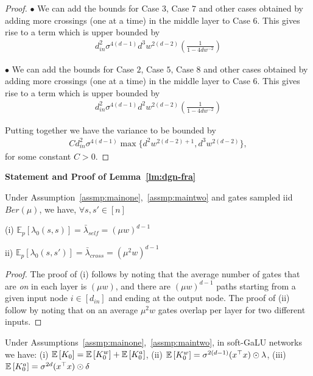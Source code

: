 \begin{proof}
$\bullet$ We can add the bounds for Case $3$, Case $7$ and other cases obtained by adding more crossings (one at a time) in the middle layer to Case $6$. This gives rise to a term which is upper bounded by 
\begin{align*}
d^2_{in}\sigma^{4(d-1)}d^3w^{2(d-2)} \left(\frac{1}{1-4dw^{-2}}\right)
\end{align*}



$\bullet$ We can add the bounds for Case $2$, Case $5$, Case $8$ and other cases obtained by adding more crossings (one at a time) in the middle layer to Case $6$. This gives rise to a term which is upper bounded by 
\begin{align*}
d^2_{in}\sigma^{4(d-1)}d^2w^{2(d-2)} \left(\frac{1}{1-4dw^{-2}}\right)
\end{align*}

Putting together we have the variance to be bounded by 
\begin{align*}
Cd^2_{in}\sigma^{4(d-1)}\max\{d^2w^{2(d-2)+1}, d^3w^{2(d-2)}\},
\end{align*}
for some constant $C>0$.
\end{proof}


\textbf{Statement and Proof of Lemma~\ref{lm:dgn-fra}}
\begin{lemma}
 Under Assumption~\ref{assmp:mainone},~\ref{assmp:maintwo} and gates sampled iid $Ber(\mu)$, we have, $\forall s,s'\in[n]$

(i) $\mathbb{E}_p\left[\lambda_0(s,s)\right]=\bar{\lambda}_{self}=(\mu w)^{d-1}$

ii) $\mathbb{E}_p\left[\lambda_0(s,s')\right]=\bar{\lambda}_{cross}= (\mu^2w)^{d-1}$
\end{lemma}

\begin{proof}
The proof of (i) follows by noting that the average number of gates that are \emph{on} in each layer is $(\mu w)$, and there are $(\mu w)^{d-1}$ paths starting from a given input node $i\in[d_{in}]$ and ending at the output node. The proof of (ii) follow by noting that on an average $\mu^2w$ gates overlap per layer for two different inputs.
\end{proof}



\begin{lemma} 
Under Assumptions~\ref{assmp:mainone},~\ref{assmp:maintwo}, in soft-GaLU networks we have: (i) $\mathbb{E}\left[K_0\right]=\mathbb{E}\left[K^w_0\right]+\mathbb{E}\left[K^a_0\right]$, 
 (ii) $\mathbb{E}\left[K^w_0\right]=\sigma^{2(d-1)} (x^\top x)\odot \lambda$,  (iii) $\mathbb{E}\left[K^a_0\right]=\sigma^{2d}  (x^\top x)\odot \delta$
\end{lemma}

